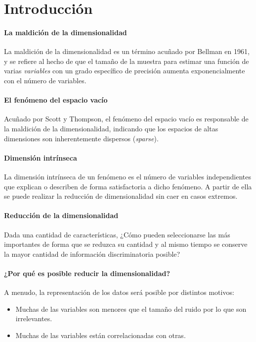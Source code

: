 \documentclass{article}
\begin{document}
\section{Introducción}

\paragraph{La maldición de la dimensionalidad}
\label{par:la_maldicion_de_la_dimensionalidad}
La maldición de la dimensionalidad es un término acuñado por Bellman en 1961, y se refiere al hecho de que el tamaño de la muestra para estimar una función de varias \emph{variables} con un grado específico de precisión aumenta exponencialmente con el número de variables.

\paragraph{El fenómeno del espacio vacío}
\label{par:el_fenomeno_del_espacio_vacio}
Acuñado por Scott y Thompson, el fenómeno del espacio vacío es responsable de la maldición de la dimensionalidad, indicando que los espacios de altas dimensiones son inherentemente dispersos (\emph{sparse}).

\paragraph{Dimensión intrínseca}
\label{par:dimension_intrinseca}
La dimensión intrínseca de un fenómeno es el número de variables independientes que explican o describen de forma satisfactoria a dicho fenómeno.
A partir de ella se puede realizar la reducción de dimensionalidad sin caer en casos extremos.

\paragraph{Reducción de la dimensionalidad}
\label{par:reduccion_de_la_dimensionalidad}
Dada una cantidad de características, ¿Cómo pueden seleccionarse las más importantes de forma que se reduzca su cantidad y al mismo tiempo se conserve la mayor cantidad de información discriminatoria posible?

\paragraph{¿Por qué es posible reducir la dimensionalidad?} 
\label{par:por_que_es_posible_reducir_la_dimensionalidad}
A menudo, la representación de los datos será posible por distintos motivos:
\begin{itemize}
	\item Muchas de las variables son menores que el tamaño del ruido por lo que son irrelevantes.
	\item Muchas de las variables están correlacionadas con otras.
\end{itemize}
\end{document}
